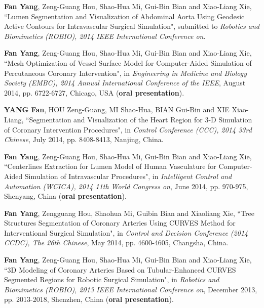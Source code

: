
\begin{publications}{99}

\item \textbf{Fan Yang}, Zeng-Guang Hou, Shao-Hua Mi, Gui-Bin Bian and Xiao-Liang Xie, ``Lumen Segmentation and Visualization of Abdominal Aorta Using Geodesic Active Contours for Intravascular Surgical Simulation", submitted to \textit{Robotics and Biomimetics (ROBIO), 2014 IEEE International Conference on}.%

\item \textbf{Fan Yang}, Zeng-Guang Hou, Shao-Hua Mi, Gui-Bin Bian and Xiao-Liang Xie, ``Mesh Optimization of Vessel Surface Model for Computer-Aided Simulation of Percutaneous Coronary Intervention", in \textit{Engineering in Medicine and Biology Society (EMBC), 2014 Annual International Conference of the IEEE}, August 2014, pp. 6722-6727, Chicago, USA (\textbf{oral presentation}).%

\item \textbf{YANG Fan}, HOU Zeng-Guang, MI Shao-Hua, BIAN Gui-Bin and XIE Xiao-Liang, ``Segmentation and Visualization of the Heart Region for 3-D Simulation of Coronary Intervention Procedures", in \textit{Control Conference (CCC), 2014 33rd Chinese}, July 2014, pp. 8408-8413, Nanjing, China.%

\item \textbf{Fan Yang}, Zeng-Guang Hou, Shao-Hua Mi, Gui-Bin Bian and Xiao-Liang Xie, ``Centerlines Extraction for Lumen Model of Human Vasculature for Computer-Aided Simulation of Intravascular Procedures", in \textit{Intelligent Control and Automation (WCICA), 2014 11th World Congress on}, June 2014, pp. 970-975, Shenyang, China (\textbf{oral presentation}).%

\item \textbf{Fan Yang}, Zengguang Hou, Shaohua Mi, Guibin Bian and Xiaoliang Xie, ``Tree Structures Segmentation of Coronary Arteries Using CURVES Method for Interventional Surgical Simulation", in \textit{Control and Decision Conference (2014 CCDC), The 26th Chinese}, May 2014, pp. 4600-4605, Changsha, China.%

\item \textbf{Fan Yang}, Zeng-Guang Hou, Shao-Hua Mi, Gui-Bin Bian and Xiao-Liang Xie, ``3D Modeling of Coronary Arteries Based on Tubular-Enhanced CURVES Segmented Regions for Robotic Surgical Simulation", in \textit{Robotics and Biomimetics (ROBIO), 2013 IEEE International Conference on}, December 2013, pp. 2013-2018, Shenzhen, China (\textbf{oral presentation}).%


\end{publications}
